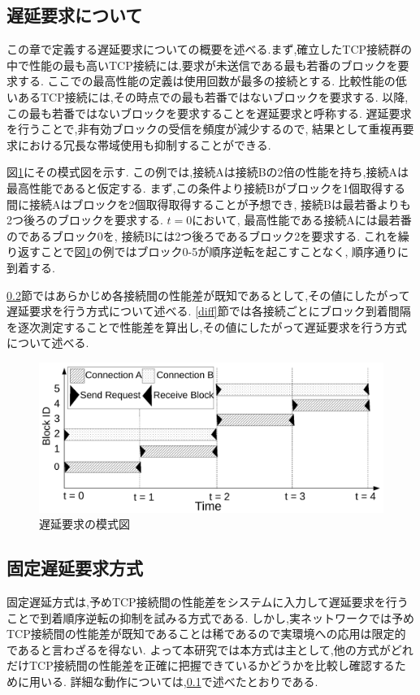 \documentclass[a4j,12pt]{gradthesis_utf8}
\begin{document}
\newpage

\subsection{遅延要求について}
\label{chienyokyu}
この章で定義する遅延要求についての概要を述べる.まず,確立したTCP接続群の中で性能の最も高いTCP接続には,要求が未送信である最も若番のブロックを要求する.
ここでの最高性能の定義は使用回数が最多の接続とする.
比較性能の低いあるTCP接続には,その時点での最も若番ではないブロックを要求する.
以降,この最も若番ではないブロックを要求することを遅延要求と呼称する.
遅延要求を行うことで,非有効ブロックの受信を頻度が減少するので,
結果として重複再要求における冗長な帯域使用も抑制することができる.

図\ref{delay}にその模式図を示す.
この例では,接続Aは接続Bの2倍の性能を持ち,接続Aは最高性能であると仮定する.
まず,この条件より接続Bがブロックを1個取得する間に接続Aはブロックを2個取得取得することが予想でき,
接続Bは最若番よりも2つ後ろのブロックを要求する.
\begin{math}t=0\end{math}において,
最高性能である接続Aには最若番のであるブロック0を,
接続Bには2つ後ろであるブロック2を要求する.
これを繰り返すことで図\ref{delay}の例ではブロック0-5が順序逆転を起こすことなく,
順序通りに到着する.

\ref{kotei}節ではあらかじめ各接続間の性能差が既知であるとして,その値にしたがって遅延要求を行う方式について述べる.
\ref{diff}節では各接続ごとにブロック到着間隔を逐次測定することで性能差を算出し,その値にしたがって遅延要求を行う方式について述べる.

\begin{figure}[ht]
    \centering
    \includegraphics[width=16.25cm]{figure/delay-n.pdf}
    \caption{遅延要求の模式図}
    \label{delay}
\end{figure}

\subsection{固定遅延要求方式}
\label{kotei}
固定遅延方式は,予めTCP接続間の性能差をシステムに入力して遅延要求を行うことで到着順序逆転の抑制を試みる方式である.
しかし,実ネットワークでは予めTCP接続間の性能差が既知であることは稀であるので実環境への応用は限定的であると言わざるを得ない.
よって本研究では本方式は主として,他の方式がどれだけTCP接続間の性能差を正確に把握できているかどうかを比較し確認するために用いる.
詳細な動作については,\ref{chienyokyu}で述べたとおりである.
\end{document}
